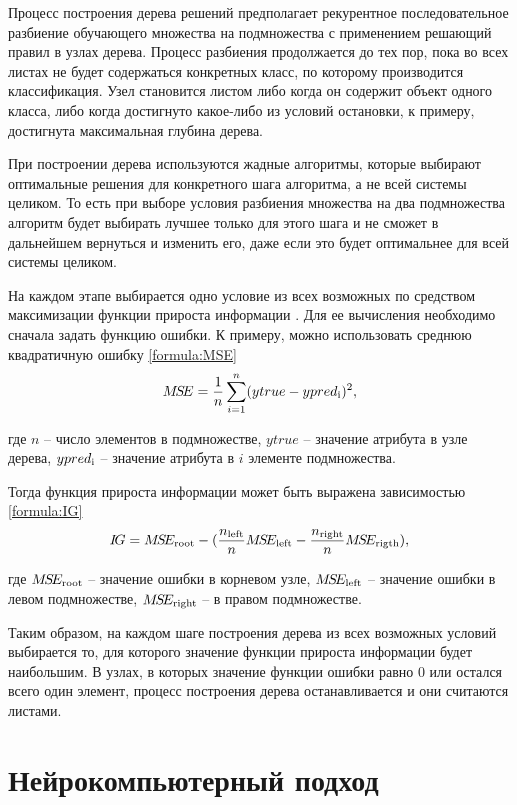 Процесс построения дерева решений предполагает рекурентное последовательное разбиение обучающего множества на подмножества с применением решающий правил в узлах дерева. Процесс разбиения продолжается до тех пор, пока во всех листах не будет содержаться конкретных класс, по которому производится классификация. Узел становится листом либо когда он содержит объект одного класса, либо когда достигнуто какое-либо из условий остановки, к примеру, достигнута максимальная глубина дерева.

При построении дерева используются жадные алгоритмы, которые выбирают оптимальные решения для конкретного шага алгоритма, а не всей системы целиком. То есть при выборе условия разбиения множества на два подмножества алгоритм будет выбирать лучшее только для этого шага и не сможет в дальнейшем вернуться и изменить его, даже если это будет оптимальнее для всей системы целиком.

На каждом этапе выбирается одно условие из всех возможных по средством максимизации функции прироста информации \cite{solve_tree}. Для ее вычисления необходимо сначала задать функцию ошибки. К примеру, можно использовать среднюю квадратичную ошибку \ref{formula:MSE}
\begin{equation}\label{formula:MSE}
M\!S\!E = \frac{1}{n}\sum\limits_{i = 1}^{n}(ytrue - ypred_{\rm{i}})^2,
\end{equation} 

где $n$ -- число элементов в подмножестве, $ytrue$ -- значение атрибута в узле дерева, $ypred_{\rm{i}}$ -- значение атрибута в $i$ элементе подмножества.

Тогда функция прироста информации может быть выражена зависимостью \ref{formula:IG}
\begin{equation}\label{formula:IG}
I\!G = M\!S\!E_{\rm{root}} - (\frac{n_{\rm{left}}}{n}M\!S\!E_{\rm{left}} - \frac{n_{\rm{right}}}{n}M\!S\!E_{\rm{rigth}}),
\end{equation} 

где $M\!S\!E_{\rm{root}}$ -- значение ошибки в корневом узле, $M\!S\!E_{\rm{left}}$ -- значение ошибки в левом подмножестве, $M\!S\!E_{\rm{right}}$ -- в правом подмножестве.

Таким образом, на каждом шаге построения дерева из всех возможных условий выбирается то, для которого значение функции прироста информации будет наибольшим. В узлах, в которых значение функции ошибки равно 0 или остался всего один элемент, процесс построения дерева останавливается и они считаются листами.

\section{Нейрокомпьютерный подход}\label{sec:neuro}

